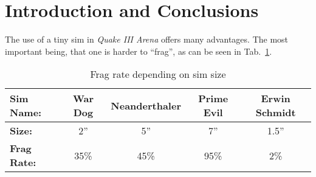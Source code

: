\documentclass[a4paper,10pt]{article}
\begin{document}

\section{Introduction and Conclusions}

The use of a tiny sim in \emph{Quake III Arena} offers many advantages.
The most important being, that one is harder to ``frag'', as can be seen in
Tab.~\ref{FRAGS}.

\begin{table}[h]
  \centering
  \begin{tabular}{|l|*{4}{c}|}
    \hline
    \textbf{Sim Name:} & War Dog & Neanderthaler & Prime Evil & Erwin Schmidt \\
    \hline
    \textbf{Size:} & 2'' & 5'' & 7'' & 1.5'' \\
    \hline
    \textbf{Frag Rate:} & 35\%  & 45\% & 95\% & 2\% \\ 
    \hline
  \end{tabular}
  \caption{Frag rate depending on sim size}
  \label{FRAGS}
\end{table}
\end{document}
